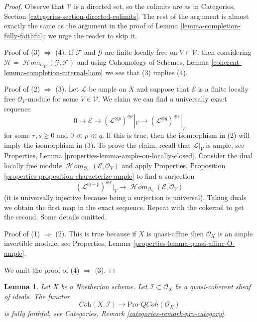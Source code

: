 \documentclass{stacks-project}
\theoremstyle{plain}
\newtheorem{lemma}[subsection]{Lemma}
\theoremstyle{definition}
\theoremstyle{remark}
\numberwithin{equation}{subsection}
\def\SheafHom{\mathop{\mathcal{H}\!\mathit{om}}\nolimits}
\def\QCoh{\mathit{QCoh}}
\begin{document}
\begin{proof}
Observe that $\mathcal{V}$ is a directed set, so the colimits are
as in Categories, Section \ref{categories-section-directed-colimits}.
The rest of the argument is almost exactly the same as the argument
in the proof of Lemma \ref{lemma-completion-fully-faithful}; we urge
the reader to skip it.

\medskip\noindent
Proof of (3) $\Rightarrow$ (4). If $\mathcal{F}$ and $\mathcal{G}$
are finite locally free on $V \in \mathcal{V}$, then considering
$\mathcal{H} = \SheafHom_{\mathcal{O}_V}(\mathcal{G}, \mathcal{F})$
and using Cohomology of Schemes, Lemma
\ref{coherent-lemma-completion-internal-hom}
we see that (3) implies (4).

\medskip\noindent
Proof of (2) $\Rightarrow$ (3). Let $\mathcal{L}$ be ample
on $X$ and suppose that $\mathcal{E}$ is a
finite locally free $\mathcal{O}_V$-module
for some $V \in \mathcal{V}$.
We claim we can find a universally exact sequence
$$
0 \to \mathcal{E} \to
(\mathcal{L}^{\otimes p})^{\oplus r}|_{V} \to
(\mathcal{L}^{\otimes q})^{\oplus s}|_{V}
$$
for some $r, s \geq 0$ and $0 \ll p \ll q$. If this is true, then
the isomorphism in (2) will imply the isomorphism in (3).
To prove the claim, recall that $\mathcal{L}|_V$ is ample, see
Properties, Lemma \ref{properties-lemma-ample-on-locally-closed}.
Consider the dual locally free module
$\SheafHom_{\mathcal{O}_V}(\mathcal{E}, \mathcal{O}_V)$
and apply
Properties, Proposition \ref{properties-proposition-characterize-ample}
to find a surjection
$$
(\mathcal{L}^{\otimes -p})^{\oplus r}|_V \longrightarrow
\SheafHom_{\mathcal{O}_V}(\mathcal{E}, \mathcal{O}_V)
$$
(it is universally injective because being a surjection is universal).
Taking duals we obtain the first map in the exact sequence.
Repeat with the cokernel to get the second. Some details omitted.

\medskip\noindent
Proof of (1) $\Rightarrow$ (2). This is true because if $X$ is quasi-affine
then $\mathcal{O}_X$ is an ample invertible module, see
Properties, Lemma \ref{properties-lemma-quasi-affine-O-ample}.

\medskip\noindent
We omit the proof of (4) $\Rightarrow$ (3).
\end{proof}

\begin{lemma}
\label{lemma-recognize-formal-coherent-modules}
Let $X$ be a Noetherian scheme. Let $\mathcal{I} \subset \mathcal{O}_X$
be a quasi-coherent sheaf of ideals. The functor
$$
\textit{Coh}(X, \mathcal{I}) \longrightarrow \text{Pro-}\QCoh(\mathcal{O}_X)
$$
is fully faithful, see Categories, Remark \ref{categories-remark-pro-category}.
\end{lemma}
\end{document}
